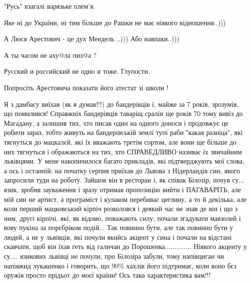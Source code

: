 \begin{itemize}
"Русь" взагалі варязьке плем'я.

Яке ні до України, ні тим більше до Рашки не має ніякого відношення..)))

А Люся Арестович - це дух Мендель ..))) Або навпаки..)))

 
А ты часом не аху@ла пиз@а ?

 
Русский и российский не одно и тоже. Глупости.

 
Попросіть Арестовича показати його атестат зі школи !

 

Я з дамбасу виїхав (як я думав!!!) до бандерівців і, майже за 7 років,
зрозумів, що помилився! Справжніх бандерівців таваріщ сралін ще років 70 тому
вивіз до Магадану, а залишив тих, хто писав один на одного доноси і продовжує
це робити зараз, тобто живуть на бандерівській землі тупі раби "какая разніца",
які тягнуться до мацкалєй, які їх вважають третім сортом, але вони ще більше до
них тягнуться і ображаються на тих, хто СПРАВЕДЛИВО називає їх звичайним
львівцями. У мене накопичилося багато прикладів, які підтверджують мої слова, а
ось і останній: на початку серпня приїхав до Львова з Нідерландів син, якого
запросили туди на роботу. Зайшов він в ресторан і, як співак Білозір, почув
су... язик, зробив зауваження і зразу отримав пропозицію вийти і ПАГАВАРІТЬ,
але мій син не артист, а програміст і кулаком перебиває цеглину, а то й
декілька, але коли перший мацковський кірпіч розколовся і деякий час не знав де
він і що з ним, другі кірпічі, які, як відомо, поважають силу, почали згадувати
мавзолей і вову пукіна за порєбріком подій... Так повинно бути, але так повинно
бути у людей, а не у львівців, які почули якийсь акцент у сина і почали на
відстані скавчати, щоб він їхав геть від галичан до Порошенка..............
Ніякого акценту у су.... язикових львівці не почули, про Білозіра забули, тому
напівциган чи напівжид лукашенко і говорить, що 90\% хахлів його підтримає, коли
воно бєз оружія просто прідьот до моєї країни! Ось така характеристика вам!!!


\end{itemize}
